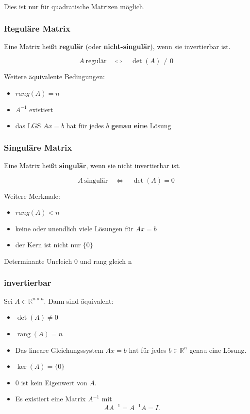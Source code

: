 \documentclass[10pt,a4paper,twocolumn]{article}
\begin{document}
	Dies ist nur für quadratische Matrizen möglich.
	
	\subsubsection{Reguläre Matrix}
	Eine Matrix heißt \textbf{regulär} (oder \textbf{nicht-singulär}), wenn sie invertierbar ist.
	
	\[
	A \ \text{regulär} 
	\quad\Longleftrightarrow\quad
	\det(A) \neq 0
	\]
	
	Weitere äquivalente Bedingungen:
	\begin{itemize}
		\item $rang(A)=n$
		\item $A^{-1}$ existiert
		\item das LGS $Ax=b$ hat für jedes $b$ \textbf{genau eine} Lösung
	\end{itemize}
	
	\subsubsection{Singuläre Matrix}
	Eine Matrix heißt \textbf{singulär}, wenn sie nicht invertierbar ist.
	
	\[
	A \ \text{singulär}
	\quad\Longleftrightarrow\quad
	\det(A)=0
	\]
	
	Weitere Merkmale:
	\begin{itemize}
		\item $rang(A)<n$
		\item keine oder unendlich viele Lösungen für $Ax=b$
		\item der Kern ist nicht nur $\{0\}$
	\end{itemize}
	
	Determinante Uncleich 0 und rang gleich n
	\subsubsection{invertierbar}
	Sei $A \in \mathbb{R}^{n\times n}$. Dann sind äquivalent:
	
	\begin{itemize}
		\item $\det(A) \neq 0$
		\item $\operatorname{rang}(A) = n$
		\item Das lineare Gleichungssystem $Ax=b$ hat für jedes $b \in \mathbb{R}^n$ genau eine Lösung.
		\item $\ker(A) = \{0\}$
		\item $0$ ist kein Eigenwert von $A$.
		\item Es existiert eine Matrix $A^{-1}$ mit
		\[
		A A^{-1} = A^{-1} A = I.
		\]
	\end{itemize}
\end{document}
